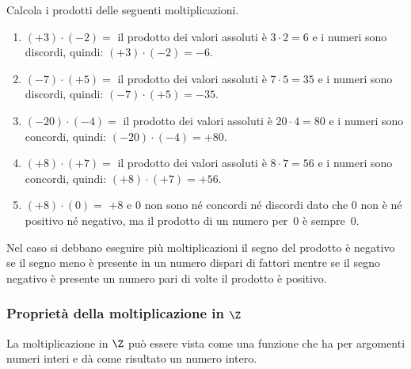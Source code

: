\begin{esempio}{}{}
Calcola i prodotti delle seguenti moltiplicazioni.
\begin{enumerate}[noitemsep, label=(\alph*)]
\item \((+3) \cdot (-2)=\) 
il prodotto dei valori assoluti è \(3 \cdot 2 = 6\) 
e i numeri sono discordi, quindi: \((+3) \cdot (-2) = -6\).
\item \((-7) \cdot (+5) =\) 
il prodotto dei valori assoluti è \(7 \cdot 5 = 35\) 
e i numeri sono discordi, quindi: \((-7) \cdot (+5) = -35\).
\item \((-20) \cdot (-4) =\) 
il prodotto dei valori assoluti è \(20 \cdot 4 = 80\) 
e i numeri sono concordi, quindi: \((-20) \cdot (-4) = +80\).
\item \((+8) \cdot (+7) =\) 
il prodotto dei valori assoluti è \(8 \cdot 7 = 56\) 
e i numeri sono concordi, quindi: \((+8) \cdot (+7) = +56\).
\item \((+8) \cdot (0) =\) 
\(+8\) e  \(0\) non sono né concordi né discordi dato che 0 non è né 
positivo né negativo, ma il prodotto di un numero per~0 è sempre~0.
\end{enumerate}
\end{esempio}


Nel caso si debbano eseguire più moltiplicazioni il segno del prodotto è 
negativo se il segno meno è presente in un numero dispari di fattori 
mentre se il segno negativo è presente un numero pari di volte il prodotto 
è positivo.

\subsubsection{Proprietà della moltiplicazione in \texorpdfstring{$\Z$}{Z}}

La moltiplicazione in \(\Z\) può essere vista come una funzione che ha per 
argomenti numeri interi e dà come risultato un numero intero.

